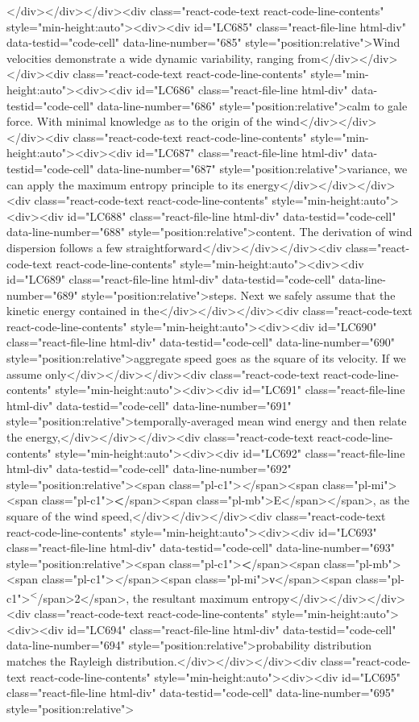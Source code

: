 {{{{{</div></div></div><div class="react-code-text react-code-line-contents" style="min-height:auto"><div><div id="LC685" class="react-file-line html-div" data-testid="code-cell" data-line-number="685" style="position:relative">Wind velocities demonstrate a wide dynamic variability, ranging from</div></div></div><div class="react-code-text react-code-line-contents" style="min-height:auto"><div><div id="LC686" class="react-file-line html-div" data-testid="code-cell" data-line-number="686" style="position:relative">calm to gale force. With minimal knowledge as to the origin of the wind</div></div></div><div class="react-code-text react-code-line-contents" style="min-height:auto"><div><div id="LC687" class="react-file-line html-div" data-testid="code-cell" data-line-number="687" style="position:relative">variance, we can apply the maximum entropy principle to its energy</div></div></div><div class="react-code-text react-code-line-contents" style="min-height:auto"><div><div id="LC688" class="react-file-line html-div" data-testid="code-cell" data-line-number="688" style="position:relative">content. The derivation of wind dispersion follows a few straightforward</div></div></div><div class="react-code-text react-code-line-contents" style="min-height:auto"><div><div id="LC689" class="react-file-line html-div" data-testid="code-cell" data-line-number="689" style="position:relative">steps. Next we safely assume that the kinetic energy contained in the</div></div></div><div class="react-code-text react-code-line-contents" style="min-height:auto"><div><div id="LC690" class="react-file-line html-div" data-testid="code-cell" data-line-number="690" style="position:relative">aggregate speed goes as the square of its velocity. If we assume only</div></div></div><div class="react-code-text react-code-line-contents" style="min-height:auto"><div><div id="LC691" class="react-file-line html-div" data-testid="code-cell" data-line-number="691" style="position:relative">temporally-averaged mean wind energy and then relate the energy,</div></div></div><div class="react-code-text react-code-line-contents" style="min-height:auto"><div><div id="LC692" class="react-file-line html-div" data-testid="code-cell" data-line-number="692" style="position:relative"><span class="pl-c1">\emph</span>{<span class="pl-mi"><span class="pl-c1">\textbf</span>{<span class="pl-mb">E</span>}</span>}, as the square of the wind speed,</div></div></div><div class="react-code-text react-code-line-contents" style="min-height:auto"><div><div id="LC693" class="react-file-line html-div" data-testid="code-cell" data-line-number="693" style="position:relative"><span class="pl-c1">\textbf</span>{<span class="pl-mb"><span class="pl-c1">\emph</span>{<span class="pl-mi">ν</span>}<span class="pl-c1">\textsuperscript</span>{2}</span>}, the resultant maximum entropy</div></div></div><div class="react-code-text react-code-line-contents" style="min-height:auto"><div><div id="LC694" class="react-file-line html-div" data-testid="code-cell" data-line-number="694" style="position:relative">probability distribution matches the Rayleigh distribution.</div></div></div><div class="react-code-text react-code-line-contents" style="min-height:auto"><div><div id="LC695" class="react-file-line html-div" data-testid="code-cell" data-line-number="695" style="position:relative">
}}}}}
